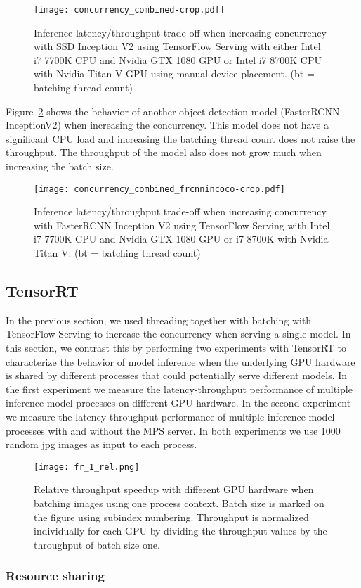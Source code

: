 \documentclass[sigconf]{acmart}
\begin{document}
\begin{figure}[t]
\centering
\texttt{[image: concurrency\_combined-crop.pdf]}
\caption{Inference latency/throughput trade-off when increasing concurrency with SSD Inception V2 using TensorFlow Serving with either Intel i7 7700K CPU and Nvidia GTX 1080 GPU or Intel i7 8700K CPU with Nvidia Titan V GPU using manual device placement. (bt = batching thread count)}
\label{fig:concurrency_combined}
\end{figure}

Figure~\ref{fig:concurrency_latency_frcnninc} shows the behavior of another object detection model (FasterRCNN InceptionV2) when increasing the concurrency. This model does not have a significant CPU load and increasing the batching thread count does not raise the throughput. The throughput of the model also does not grow much when increasing the batch size.

\begin{figure}[t]
\centering
\texttt{[image: concurrency\_combined\_frcnnincoco-crop.pdf]}
\caption{Inference latency/throughput trade-off when increasing concurrency with FasterRCNN Inception V2 using TensorFlow Serving with Intel i7 7700K CPU and Nvidia GTX 1080 GPU or i7 8700K with Nvidia Titan V. (bt = batching thread count)}
\label{fig:concurrency_latency_frcnninc}
\end{figure}\subsection{TensorRT}In the previous section, we used threading together with batching with TensorFlow Serving to increase the concurrency when serving a single model. In this section, we contrast this by performing two experiments with TensorRT to characterize the behavior of model inference when the underlying GPU hardware is shared by different processes that could potentially serve different models. In the first experiment we measure the latency-throughput performance of multiple inference model processes on different GPU hardware. In the second experiment we measure the latency-throughput performance of multiple inference model processes with and without the MPS server. In both experiments we use 1000 random jpg images as input to each process.

\begin{figure}[t]
\centering
\texttt{[image: fr\_1\_rel.png]}
\caption{Relative throughput speedup with different GPU hardware when batching images using one process context. Batch size is marked on the figure using subindex numbering. Throughput is normalized individually for each GPU by dividing the throughput values by the throughput of batch size one.}
\label{fig:fr_1_rel}
\end{figure}\subsubsection{Resource sharing}
\end{document}
